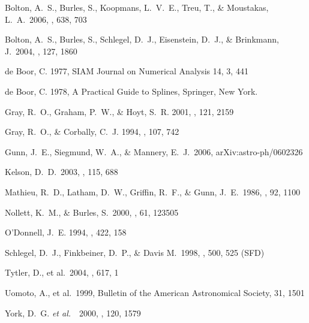 \documentclass[12pt,preprint]{aastex}
\newcommand{\etal}{{\it et al.}~}
\begin{document}
\begin{thebibliography}{DUM}

 Bolton, A.~S., Burles, 
S., Koopmans, L.~V.~E., Treu, T., \& Moustakas, L.~A.\ 2006, \apj, 638, 703 

 Bolton, A.~S., Burles, 
S., Schlegel, D.~J., Eisenstein, D.~J., \& Brinkmann, J.\ 2004, \aj, 127, 
1860 

de Boor, C. 1977,  SIAM Journal on Numerical Analysis 14, 3, 441

de Boor, C. 1978, A Practical Guide to Splines, Springer, New York.

Gray, R.\ O., Graham, P.\ W., \& Hoyt, S.\ R. 2001, \aj, 121, 2159

Gray, R.\ O., \& Corbally, C.\ J. 1994, \aj, 107, 742

 Gunn, J.~E., Siegmund, 
W.~A., \& Mannery, E.~J.\ 2006, arXiv:astro-ph/0602326 

 Kelson, D.~D.\ 2003, \pasp, 
115, 688 

\bibitem[Mathieu \etal\ (1896)]{1986AJ...92...1100} Mathieu, R.~D.,
Latham, D.~W., Griffin, R.~F., \& Gunn, J.~E.\ 1986, \aj, 92, 1100

 Nollett, K.~M., \& 
Burles, S.\ 2000, \prd, 61, 123505 
 
O'Donnell, J.\ E. 1994, \apj, 422, 158

Schlegel, D.\ J., Finkbeiner, D.\ P., \& Davis M.\ 1998, \apj, 500, 525 (SFD)

 Tytler, D., et al.\ 
2004, \apj, 617, 1 

 Uomoto, A., et al.\ 
1999, Bulletin of the American Astronomical Society, 31, 1501 
 
\bibitem[York et al. 2000]{york00}
York, D.\ G. \etal\ 2000, \aj, 120, 1579

\end{thebibliography}
\clearpage
\end{document}
